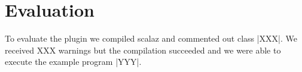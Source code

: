 \section{Evaluation}

To evaluate the plugin we compiled scalaz and commented out class |XXX|. We received XXX warnings but the compilation succeeded and we were able to execute the example program |YYY|.